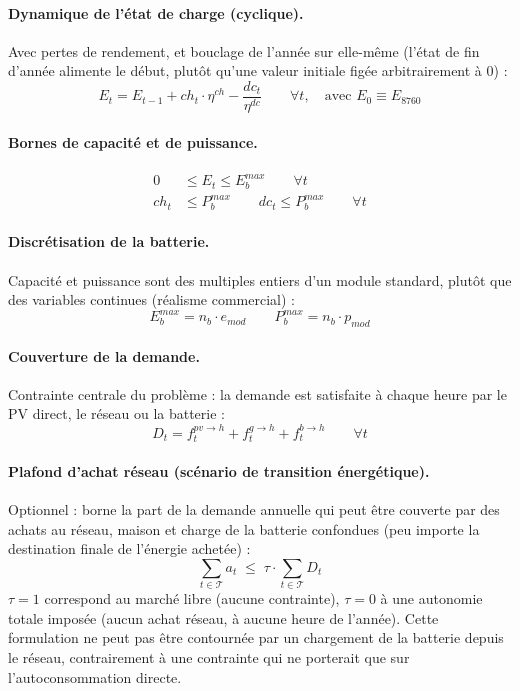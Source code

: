 \documentclass[11pt]{article}
\begin{document}
\paragraph{Dynamique de l'état de charge (cyclique).} Avec pertes de rendement, et
bouclage de l'année sur elle-même (l'état de fin d'année alimente le début, plutôt qu'une
valeur initiale figée arbitrairement à 0) :
\begin{equation}
E_t = E_{t-1} + ch_t \cdot \eta^{ch} - \frac{dc_t}{\eta^{dc}}
\qquad \forall t, \quad \text{avec } E_0 \equiv E_{8760}
\end{equation}

\paragraph{Bornes de capacité et de puissance.}
\begin{align}
0 &\leq E_t \leq E^{max}_{b} \qquad \forall t \\
ch_t &\leq P^{max}_{b} \qquad dc_t \leq P^{max}_{b} \qquad \forall t
\end{align}

\paragraph{Discrétisation de la batterie.} Capacité et puissance sont des multiples
entiers d'un module standard, plutôt que des variables continues (réalisme commercial) :
\begin{equation}
E^{max}_{b} = n_{b} \cdot e_{mod} \qquad P^{max}_{b} = n_{b} \cdot p_{mod}
\end{equation}

\paragraph{Couverture de la demande.} Contrainte centrale du problème : la demande est
satisfaite à chaque heure par le PV direct, le réseau ou la batterie :
\begin{equation}
D_t = f^{pv\to h}_t + f^{g\to h}_t + f^{b\to h}_t \qquad \forall t
\end{equation}

\paragraph{Plafond d'achat réseau (scénario de transition énergétique).} Optionnel : borne
la part de la demande annuelle qui peut être couverte par des achats au réseau, maison et
charge de la batterie confondues (peu importe la destination finale de l'énergie achetée) :
\begin{equation}
\sum_{t \in \mathcal{T}} a_t \;\leq\; \tau \cdot \sum_{t \in \mathcal{T}} D_t
\end{equation}
$\tau = 1$ correspond au marché libre (aucune contrainte), $\tau = 0$ à une autonomie
totale imposée (aucun achat réseau, à aucune heure de l'année). Cette formulation ne peut
pas être contournée par un chargement de la batterie depuis le réseau, contrairement à une
contrainte qui ne porterait que sur l'autoconsommation directe.
\end{document}
